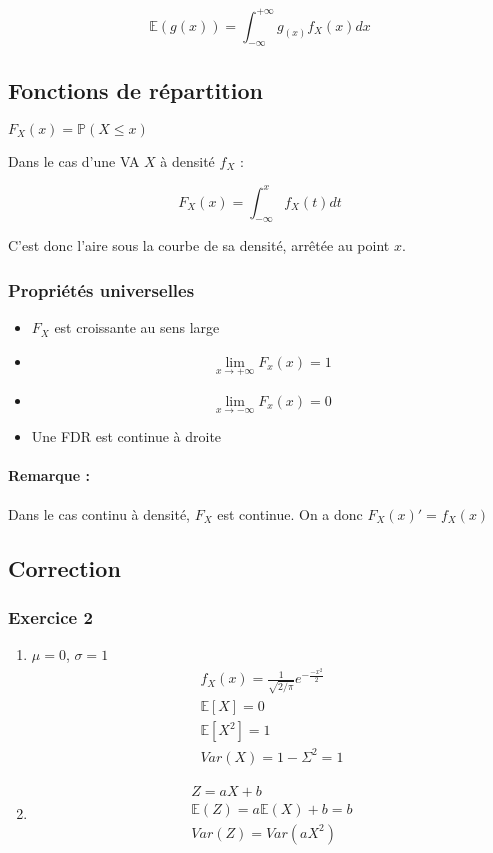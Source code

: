 \documentclass{article}
\begin{document}
$$\mathbb{E}(g(x)) = \int_{- \infty}^{+ \infty}g_(x) f_{X}(x)dx $$

\subsection{Fonctions de répartition}

$F_{X}(x) = \mathbb{P}(X \leq x)$

Dans le cas d'une VA $X$ à densité $f_{X}$ :

$$F_{X}(x) = \int_{- \infty}^{x} f_{X}(t)dt $$

C'est donc l'aire sous la courbe de sa densité, arrêtée au point $x$.

\subsubsection{Propriétés universelles}

\begin{itemize}
  \item $F_{X}$ est croissante au sens large
  \item $$ \lim_{x \to + \infty} F_{x}(x) = 1 $$
  \item $$ \lim_{x \to - \infty} F_{x}(x) = 0 $$
  \item Une FDR est continue à droite
\end{itemize}

\paragraph{Remarque :} Dans le cas continu à densité, $F_{X}$ est continue.
On a donc $F_{X}(x)' = f_{X}(x)$

\subsection{Correction}

\subsubsection{Exercice 2}

\begin{enumerate}
  \item $\mu = 0$, $\sigma = 1$
  \begin{align*} f_{X}(x) = \frac{1}{\sqrt{2/\pi}}e^{-\frac{-x^2}{2}} \\
    \mathbb{E}[X] = 0 \\
    \mathbb{E}[X^2] = 1 \\
    \textit{Var}(X) = 1 - \Sigma^{2} = 1
  \end{align*}
  \item \begin{align*}
    Z = aX + b \\
    \mathbb{E}(Z) = a\mathbb{E}(X)+b = b \\
    \textit{Var}(Z) = \textit{Var}(aX^2)
  \end{align*}
\end{enumerate}
\end{document}

